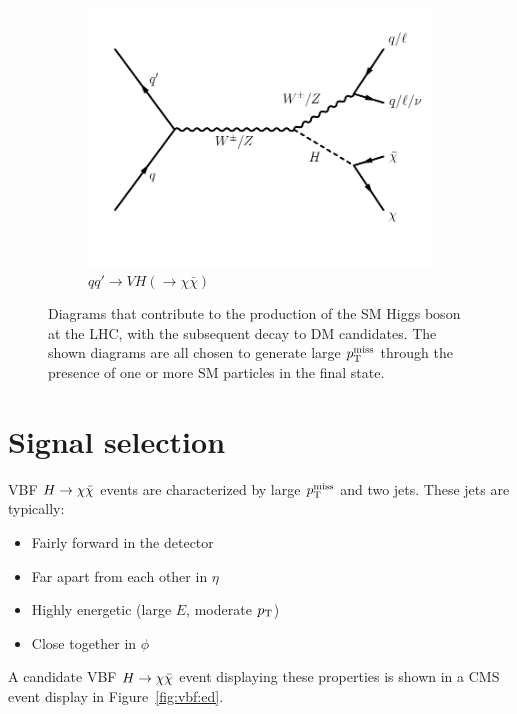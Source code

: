 \begin{figure}
\begin{center}
\begin{subfigure}[t]{0.32\textwidth}
            \includegraphics[width=\textwidth]{figures/vbf/diagrams/zh_hinv.pdf}
            \caption{$qq'\rightarrow VH(\rightarrow\chi\bar\chi)$}
        \end{subfigure}
        \caption{Diagrams that contribute to the production of the SM Higgs boson at the LHC, with the subsequent decay to DM candidates.
                 The shown diagrams are all chosen to generate large $p_\mathrm{T}^\mathrm{miss}$ through the presence of one or more SM particles in the final state.}
        \label{fig:vbf:hdiags}
    \end{center}
\end{figure}

\section{Signal selection}

VBF $H\rightarrow\chi\bar\chi$ events are characterized by large $p_\mathrm{T}^\mathrm{miss}$ and two jets.
These jets are typically:
\begin{itemize}
    \item Fairly forward in the detector
    \item Far apart from each other in $\eta$
    \item Highly energetic (large $E$, moderate $p_\mathrm{T}$)
    \item Close together in $\phi$
\end{itemize}
A candidate VBF $H\rightarrow\chi\bar\chi$ event displaying these properties is shown in a CMS event display in Figure~\ref{fig:vbf:ed}.

